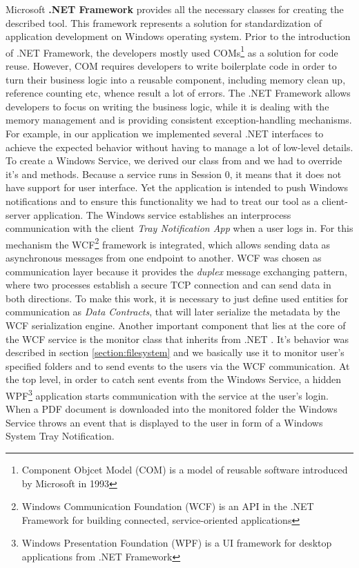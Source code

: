 Microsoft \textbf{.NET Framework} provides all the necessary classes for creating the described tool. This framework represents a solution for standardization of application development on Windows operating system. Prior to the introduction of .NET Framework, the developers mostly used COMs\footnote{Component Objcet Model (COM) is a model of reusable software introduced by Microsoft in 1993} as a solution for code reuse. However, COM requires developers to write boilerplate code in order to turn their business logic into a reusable component, including memory clean up, reference counting etc, whence result a lot of errors. The .NET Framework allows developers to focus on writing the business logic, while it is dealing with the memory management and is providing consistent exception-handling mechanisms. For example, in our application we implemented several .NET interfaces to achieve the expected behavior without having to manage a lot of low-level details. To create a Windows Service, we derived our class from  and we had to override it's  and  methods. Because a service runs in Session 0, it means that it does not have support for user interface. Yet the application is intended to push Windows notifications and to ensure this functionality we had to treat our tool as a client-server application. The Windows service establishes an interprocess communication with the client \textit{Tray Notification App} when a user logs in. For this mechanism the WCF\footnote{Windows Communication Foundation (WCF) is an API in the .NET Framework for building connected, service-oriented applications} framework is integrated, which allows sending data as asynchronous messages from one endpoint to another. WCF was chosen as communication layer because it provides the \textit{duplex} message exchanging pattern, where two processes establish a secure TCP connection and can send data in both directions. To make this work, it is necessary to just define used entities for communication as \textit{Data Contracts}, that will later serialize the metadata by the WCF serialization engine. Another important component that lies at the core of the WCF service is the monitor class that inherits from .NET . It's behavior was described in section \ref{section:filesystem} and we basically use it to monitor user's specified folders and to send events to the users via the WCF communication. At the top level, in order to catch sent events from the Windows Service, a hidden WPF\footnote{Windows Presentation Foundation (WPF) is a UI framework for desktop applications from .NET Framework} application starts communication with the service at the user's login. When a PDF document is downloaded into the monitored folder the Windows Service throws an event that is displayed to the user in form of a Windows System Tray Notification.



